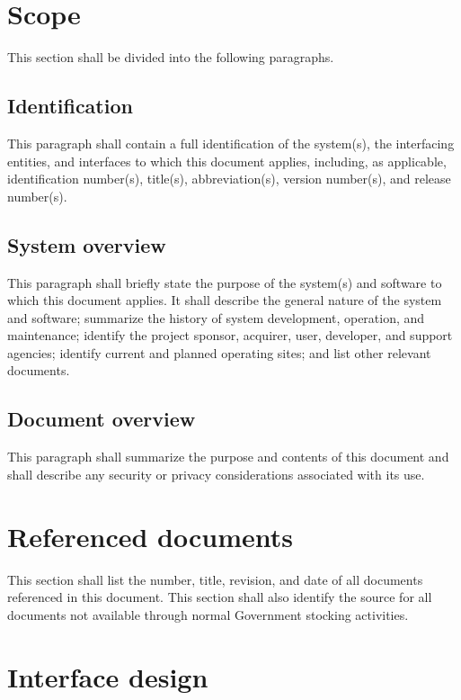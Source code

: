 \documentclass{fidata-report-template}
\begin{document}
\section{Scope}

This section shall be divided into the following paragraphs.

\subsection{Identification}

This paragraph shall contain a full identification of the system(s), the
interfacing entities, and interfaces to which this document applies,
including, as applicable, identification number(s), title(s),
abbreviation(s), version number(s), and release number(s).

\subsection{System overview}

This paragraph shall briefly state the purpose of the system(s) and
software to which this document applies. It shall describe the general
nature of the system and software; summarize the history of system
development, operation, and maintenance; identify the project sponsor,
acquirer, user, developer, and support agencies; identify current and
planned operating sites; and list other relevant documents.

\subsection{Document overview}

This paragraph shall summarize the purpose and contents of this document
and shall describe any security or privacy considerations associated
with its use.

\section{Referenced documents}

This section shall list the number, title, revision, and date of all
documents referenced in this document. This section shall also identify
the source for all documents not available through normal Government
stocking activities.

\section{Interface design}
\end{document}
